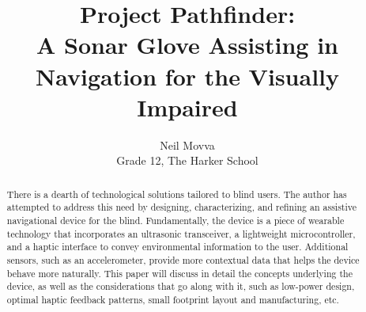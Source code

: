 \documentclass{article}
\title{Project Pathfinder:
\\
A Sonar Glove Assisting in Navigation for the Visually Impaired
}
\author{Neil Movva \\ Grade 12, The Harker School}
\begin{document}
\maketitle


\begin{abstract}

There is a dearth of technological solutions tailored to blind users. The author has attempted to address this need by designing, characterizing, and refining an assistive navigational device for the blind. Fundamentally, the device is a piece of wearable technology that incorporates an ultrasonic transceiver, a lightweight microcontroller, and a haptic interface to convey environmental information to the user. Additional sensors, such as an accelerometer, provide more contextual data that helps the device behave more naturally. This paper will discuss in detail the concepts underlying the device, as well as the considerations that go along with it, such as low-power design, optimal haptic feedback patterns, small footprint layout and manufacturing, etc.

\end{abstract}
\end{document}
